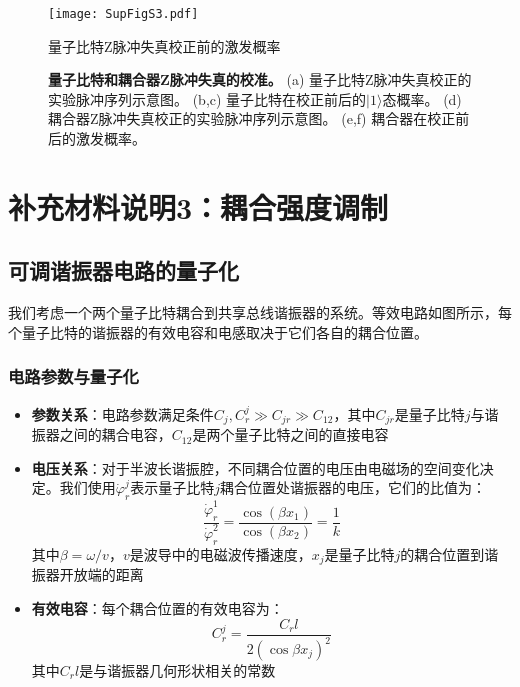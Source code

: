 \documentclass[11pt,a4paper]{article}
\begin{document}
\begin{figure}[H]
    \centering
    \texttt{[image: SupFigS3.pdf]}
    \caption{量子比特Z脉冲失真校正前的激发概率}
    \caption{
        \textbf{量子比特和耦合器Z脉冲失真的校准。}
        (a) 量子比特Z脉冲失真校正的实验脉冲序列示意图。
        (b,c) 量子比特在校正前后的$|1\rangle$态概率。
        (d) 耦合器Z脉冲失真校正的实验脉冲序列示意图。
        (e,f) 耦合器在校正前后的激发概率。
    }
    \label{fig:Z_pulse_calibration}
\end{figure}

\clearpage
\section*{补充材料说明3：耦合强度调制}

\subsection{可调谐振器电路的量子化}

我们考虑一个两个量子比特耦合到共享总线谐振器的系统。等效电路如图所示，每个量子比特的谐振器的有效电容和电感取决于它们各自的耦合位置。

\subsubsection{电路参数与量子化}

\begin{itemize}
    \item \textbf{参数关系}：电路参数满足条件$C_j, C_r^j \gg C_{jr} \gg C_{12}$，其中$C_{jr}$是量子比特$j$与谐振器之间的耦合电容，$C_{12}$是两个量子比特之间的直接电容
    \item \textbf{电压关系}：对于半波长谐振腔，不同耦合位置的电压由电磁场的空间变化决定。我们使用$\dot{\varphi}_r^j$表示量子比特$j$耦合位置处谐振器的电压，它们的比值为：
    \[
    \frac{\dot{\varphi}_r^1}{\dot{\varphi}_r^2} = \frac{\cos(\beta x_1)}{\cos(\beta x_2)} = \frac{1}{k}
    \]
    其中$\beta = \omega/v$，$v$是波导中的电磁波传播速度，$x_j$是量子比特$j$的耦合位置到谐振器开放端的距离
    \item \textbf{有效电容}：每个耦合位置的有效电容为：
    \[
    C_r^j = \frac{C_r l}{2(\cos\beta x_j)^2}
    \]
    其中$C_r l$是与谐振器几何形状相关的常数
\end{itemize}
\end{document}
